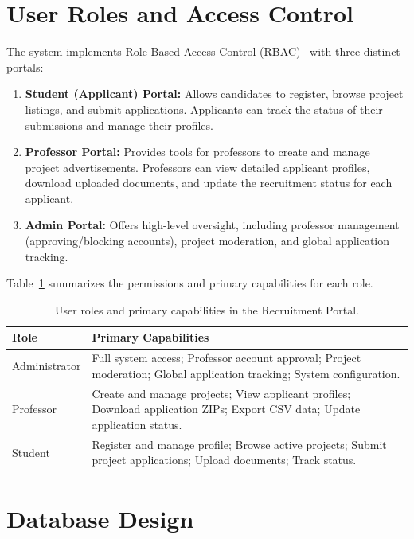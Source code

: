 \section{User Roles and Access Control}

The system implements Role-Based Access Control (RBAC)~\cite{Sandhu1996} with three distinct portals:

\begin{enumerate}
  \item \textbf{Student (Applicant) Portal:} Allows candidates to register, browse project listings, and submit applications. Applicants can track the status of their submissions and manage their profiles.
  
  \item \textbf{Professor Portal:} Provides tools for professors to create and manage project advertisements. Professors can view detailed applicant profiles, download uploaded documents, and update the recruitment status for each applicant.
  
  \item \textbf{Admin Portal:} Offers high-level oversight, including professor management (approving/blocking accounts), project moderation, and global application tracking.
\end{enumerate}

Table~\ref{tab:roles} summarizes the permissions and primary capabilities for each role.

\begin{table}[H]
  \centering
  \caption{User roles and primary capabilities in the Recruitment Portal.}
  \label{tab:roles}
  \begin{tabularx}{\textwidth}{lX}
    \hline
    \textbf{Role} & \textbf{Primary Capabilities} \\
    \hline
    Administrator & Full system access; Professor account approval; Project moderation; Global application tracking; System configuration. \\
    Professor     & Create and manage projects; View applicant profiles; Download application ZIPs; Export CSV data; Update application status. \\
    Student       & Register and manage profile; Browse active projects; Submit project applications; Upload documents; Track status. \\
    \hline
  \end{tabularx}
\end{table}

\section{Database Design}

